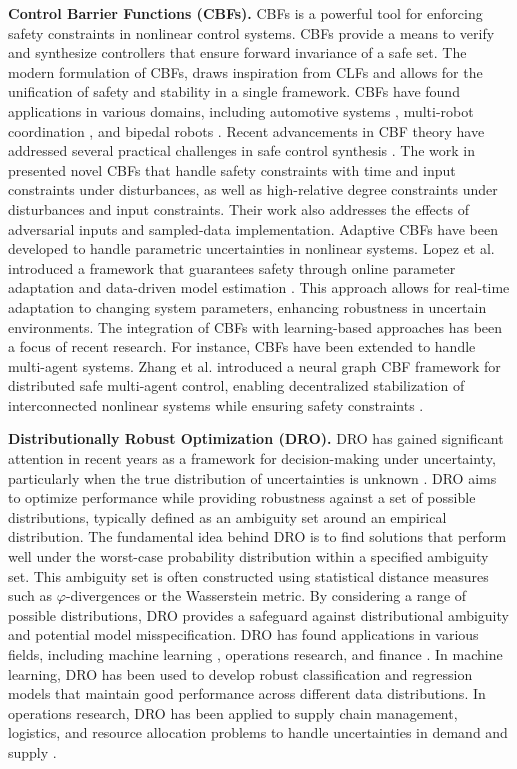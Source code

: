 \documentclass[11pt, oneside]{article}
\begin{document}
\noindent \textbf{Control Barrier Functions (CBFs).} CBFs is a powerful tool for enforcing safety constraints in nonlinear control systems. CBFs provide a means to verify and synthesize controllers that ensure forward invariance of a safe set. The modern formulation of CBFs, draws inspiration from CLFs and allows for the unification of safety and stability in a single framework. CBFs have found applications in various domains, including automotive systems \cite{ames2016control}, multi-robot coordination \cite{xu2015robustness}, and bipedal robots \cite{hsu2015control}. Recent advancements in CBF theory have addressed several practical challenges in safe control synthesis \cite{ames2019control}. The work in \cite{garg2024advances} presented novel CBFs that handle safety constraints with time and input constraints under disturbances, as well as high-relative degree constraints under disturbances and input constraints. Their work also addresses the effects of adversarial inputs and sampled-data implementation. Adaptive CBFs have been developed to handle parametric uncertainties in nonlinear systems. Lopez et al.  introduced a framework that guarantees safety through online parameter adaptation and data-driven model estimation \cite{lopez2020robust}. This approach allows for real-time adaptation to changing system parameters, enhancing robustness in uncertain environments. 
%
The integration of CBFs with learning-based approaches has been a focus of recent research. For instance, CBFs have been extended to handle multi-agent systems. Zhang et al. introduced a neural graph CBF framework for distributed safe multi-agent control, enabling decentralized stabilization of interconnected nonlinear systems while ensuring safety constraints \cite{zhang2024gcbf+}.

\noindent \textbf{Distributionally Robust Optimization (DRO).} DRO has gained significant attention in recent years as a framework for decision-making under uncertainty, particularly when the true distribution of uncertainties is unknown \cite{rahimian2019distributionally,gabrel2014recent}. DRO aims to optimize performance while providing robustness against a set of possible distributions, typically defined as an ambiguity set around an empirical distribution. The fundamental idea behind DRO is to find solutions that perform well under the worst-case probability distribution within a specified ambiguity set. This ambiguity set is often constructed using statistical distance measures such as $\varphi$-divergences or the Wasserstein metric. By considering a range of possible distributions, DRO provides a safeguard against distributional ambiguity and potential model misspecification. DRO has found applications in various fields, including machine learning \cite{zhao2024regularized}, operations research, and finance \cite{huang2021multi}. In machine learning, DRO has been used to develop robust classification and regression models that maintain good performance across different data distributions. In operations research, DRO has been applied to supply chain management, logistics, and resource allocation problems to handle uncertainties in demand and supply \cite{qiu2021distributionally,cheng2024distributionally}.
\end{document}
